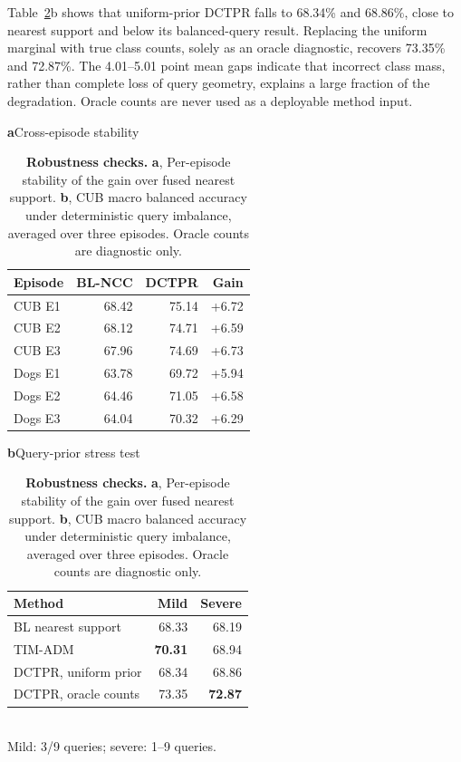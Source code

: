 \documentclass[]{spie}
\newcommand{\method}{\textsc{DCTPR}\xspace}
\begin{document}
Table~\ref{tab:robustness}b shows that uniform-prior \method falls to 68.34\% and
68.86\%, close to nearest support and below its balanced-query result. Replacing
the uniform marginal with true class counts, solely as an oracle diagnostic,
recovers 73.35\% and 72.87\%. The 4.01--5.01 point mean gaps indicate that
incorrect class mass, rather than complete loss of query geometry, explains a
large fraction of the degradation. Oracle counts are never used as a deployable
method input.

\begin{table}[!htbp]
\centering
\caption{\textbf{Robustness checks.} \textbf{a}, Per-episode stability of the
gain over fused nearest support. \textbf{b}, CUB macro balanced accuracy under
deterministic query imbalance, averaged over three episodes. Oracle counts are
diagnostic only.}
\label{tab:robustness}
\begin{minipage}[t]{0.49\textwidth}
\centering
\small
\textbf{a}\quad Cross-episode stability\\[2pt]
\begin{tabular}{lrrr}
\toprule
Episode & BL-NCC & \method & Gain \\
\midrule
CUB E1 & 68.42 & 75.14 & +6.72 \\
CUB E2 & 68.12 & 74.71 & +6.59 \\
CUB E3 & 67.96 & 74.69 & +6.73 \\
Dogs E1 & 63.78 & 69.72 & +5.94 \\
Dogs E2 & 64.46 & 71.05 & +6.58 \\
Dogs E3 & 64.04 & 70.32 & +6.29 \\
\bottomrule
\end{tabular}
\end{minipage}\hfill
\begin{minipage}[t]{0.47\textwidth}
\centering
\small
\textbf{b}\quad Query-prior stress test\\[2pt]
\begin{tabular}{lrr}
\toprule
Method & Mild & Severe \\
\midrule
BL nearest support & 68.33 & 68.19 \\
TIM-ADM & \textbf{70.31} & 68.94 \\
\method, uniform prior & 68.34 & 68.86 \\
\method, oracle counts & 73.35 & \textbf{72.87} \\
\bottomrule
\end{tabular}\\[-1pt]
\footnotesize Mild: 3/9 queries; severe: 1--9 queries.
\end{minipage}
\end{table}
\end{document}
